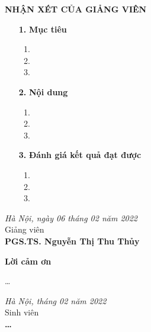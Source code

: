 \documentclass[oneside, a4paper, 12pt]{book}
\theoremstyle{plain}
\theoremstyle{definition}
\theoremstyle{remark}
\begin{document}
\restoregeometry


\newpage

\newpage
{}
\setcounter{page}{1}
\thisfancypage{
	\setlength{\fboxsep}{0.5cm}
	\fbox}{}

\fontsize{13pt}{16pt}\selectfont
\bigbreak
\begin{center}
	{\bfseries NHẬN XÉT CỦA GIẢNG VIÊN}
\end{center}
\bigbreak

\fontsize{12pt}{14pt}\selectfont
\begin{enumerate}
	\item [{\bfseries 1.}]{\bfseries Mục tiêu}
	\begin{enumerate}
		\item 
		\item 
		\item 
	\end{enumerate}
	\item [{\bfseries 2.}] {\bfseries Nội dung} 
	\begin{enumerate}
		\item 
		\item 
		\item 
	\end{enumerate}
	\item [{\bfseries 3.}]{\bfseries Đánh giá kết quả đạt được}
\begin{enumerate}
	\item  
	\item 
	\item 
\end{enumerate}
\end{enumerate}
\hspace{0.5\textwidth}
\begin{minipage}{0.5\textwidth}
	\noindent\begin{center}
		\textit{Hà Nội, ngày 06 tháng 02 năm 2022} \\
		Giảng viên\\ \vspace{2cm}
		\textbf{PGS.TS. Nguyễn Thị Thu Thủy}
	\end{center}	
\end{minipage}
\restoregeometry



\newpage
\fontsize{22pt}{16pt}\selectfont
{\bfseries Lời cảm ơn}
\fontsize{13pt}{16pt}\selectfont
\bigskip

\dots


\begin{minipage}{0.5\textwidth}
\end{minipage}
\hspace{0.5\textwidth}
\begin{minipage}{0.5\textwidth}
	\noindent\begin{center}
		\vspace{1cm}
		\textit{Hà Nội, tháng 02 năm 2022} \\
		Sinh viên\\ \vspace{2cm}
		\textbf{\dots}
	\end{center}	
\end{minipage}
\end{document}

